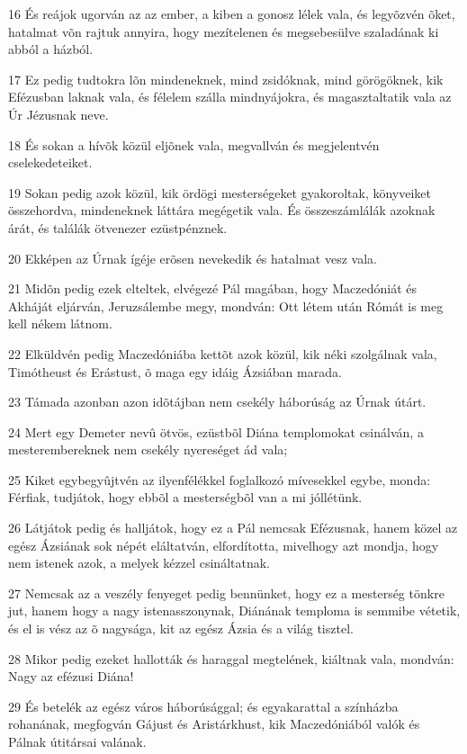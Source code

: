 \par 16 És reájok ugorván az az ember, a kiben a gonosz lélek vala, és legyõzvén õket, hatalmat võn rajtuk annyira, hogy mezítelenen és megsebesülve szaladának ki abból a házból.
\par 17 Ez pedig tudtokra lõn mindeneknek, mind zsidóknak, mind görögöknek, kik Efézusban laknak vala, és félelem szálla mindnyájokra, és magasztaltatik vala az Úr Jézusnak neve.
\par 18 És sokan a hívõk közül eljõnek vala, megvallván és megjelentvén cselekedeteiket.
\par 19 Sokan pedig azok közül, kik ördögi mesterségeket gyakoroltak, könyveiket összehordva, mindeneknek láttára megégetik vala. És összeszámlálák azoknak árát, és találák ötvenezer ezüstpénznek.
\par 20 Ekképen az Úrnak ígéje erõsen nevekedik és hatalmat vesz vala.
\par 21 Midõn pedig ezek elteltek, elvégezé Pál magában, hogy Maczedóniát és Akháját eljárván,  Jeruzsálembe megy, mondván: Ott létem után Rómát is meg kell nékem látnom.
\par 22 Elküldvén pedig Maczedóniába kettõt azok közül, kik néki szolgálnak vala, Timótheust és Erástust, õ maga egy idáig Ázsiában marada.
\par 23 Támada azonban azon idõtájban nem csekély háborúság az Úrnak útárt.
\par 24 Mert egy Demeter nevû ötvös, ezüstbõl Diána templomokat csinálván, a mesterembereknek nem csekély nyereséget ád vala;
\par 25 Kiket egybegyûjtvén az ilyenfélékkel foglalkozó mívesekkel egybe, monda: Férfiak, tudjátok, hogy ebbõl a mesterségbõl van a mi jóllétünk.
\par 26 Látjátok pedig és halljátok, hogy ez a Pál nemcsak Efézusnak, hanem közel az egész Ázsiának sok népét eláltatván, elfordította, mivelhogy azt mondja, hogy nem istenek azok, a melyek kézzel csináltatnak.
\par 27 Nemcsak az a veszély fenyeget pedig bennünket, hogy ez a mesterség tönkre jut, hanem hogy a nagy istenasszonynak, Diánának temploma is semmibe vétetik, és el is vész az õ nagysága, kit az egész Ázsia és a világ tisztel.
\par 28 Mikor pedig ezeket hallották és haraggal megtelének, kiáltnak vala, mondván: Nagy az efézusi Diána!
\par 29 És betelék az egész város háborúsággal; és egyakarattal a színházba rohanának, megfogván Gájust és Aristárkhust, kik Maczedóniából valók és Pálnak útitársai valának.
